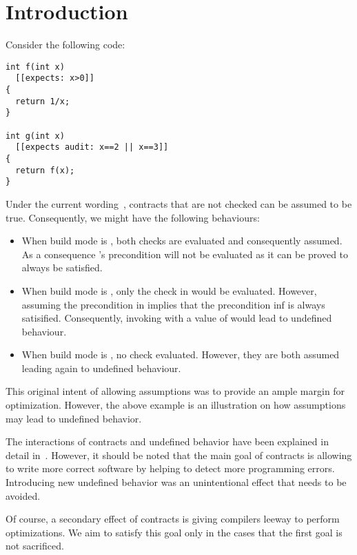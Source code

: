 \section{Introduction}

Consider the following code:

\begin{lstlisting}
int f(int x)
  [[expects: x>0]]
{
  return 1/x;
}

int g(int x)
  [[expects audit: x==2 || x==3]]
{
  return f(x);
}
\end{lstlisting}

Under the current wording~\cite{p0542r5}, contracts that are not checked can be assumed to be
true. Consequently, we might have the following behaviours:

\begin{itemize}
  \item When build mode is , both checks are evaluated and
consequently assumed. As a consequence 's precondition will not
be evaluated as it can be proved to always be satisfied.
  \item When build mode is , only the check in 
would be evaluated. However, assuming the precondition in  implies that
the precondition inf  is always satisified. Consequently, invoking
 with a value of  would lead to undefined behaviour.
  \item When build mode is , no check evaluated. However, they are
both assumed leading again to undefined behaviour.
\end{itemize}

This original intent of allowing assumptions was to provide an ample margin for
optimization. However, the above example is an illustration on how assumptions
may lead to undefined behavior.

The interactions of contracts and undefined behavior have been explained in
detail in~\cite{p1321r0}. However, it should be noted that the main goal of
contracts is allowing to write more correct software by helping to detect more
programming errors. Introducing new undefined behavior was an unintentional
effect that needs to be avoided.

Of course, a secondary effect of contracts is giving compilers leeway to perform
optimizations. We aim to satisfy this goal only in the cases that the first goal
is not sacrificed.

